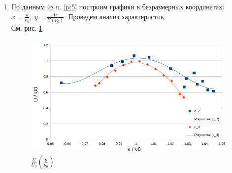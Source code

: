 \documentclass{report}
\begin{document}
\begin{enumerate}
	\item \label{p:10} По данным из п. \ref{p:5} построим графики в безразмерных координатах:
	      $ x = \frac{\nu}{\nu_0},\ y = \frac{U}{U(\nu_0)} $. Проведем анализ характеристик.\\
	      См. рис. \ref{fig:U2}.
	      \begin{figure}[H]
		      \centering
		      \def\svgwidth{\columnwidth}
		      \includegraphics[scale = 0.6]{figures/F.png}
		      \caption{$\frac{U}{U_0}(\frac{\nu}{\nu_0})$}
		      \label{fig:U2}
	      \end{figure}


\end{enumerate}
\end{document}
